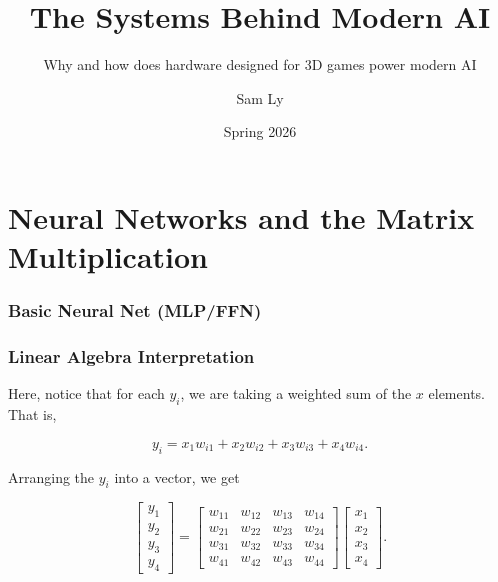 \documentclass{beamer}
\title{The Systems Behind Modern AI}
\subtitle{Why and how does hardware designed for 3D games power modern AI}
\author{Sam Ly}
\institute{Cal Poly Pomona}
\date{Spring 2026}
\begin{document}
\frame{\titlepage}

\section{Neural Networks and the Matrix Multiplication}
\begin{frame}
  \frametitle{Basic Neural Net (MLP/FFN)}
  \centering
\end{frame}

\begin{frame}
  \frametitle{Linear Algebra Interpretation}
  Here, notice that for each \(y_i\), we are taking a weighted sum of the
  \(x\) elements. That is,

  \[y_i = x_1 w_{i1} + x_2 w_{i2} + x_3 w_{i3} + x_4w_{i4}.\]

  Arranging the \(y_i\) into a vector, we get

  \[
    \begin{bmatrix}
      y_1 \\ y_2 \\ y_3 \\ y_4
    \end{bmatrix}
    =
    \begin{bmatrix}
      w_{11} & w_{12} & w_{13} & w_{14} \\
      w_{21} & w_{22} & w_{23} & w_{24} \\
      w_{31} & w_{32} & w_{33} & w_{34} \\
      w_{41} & w_{42} & w_{43} & w_{44}
    \end{bmatrix}
    \begin{bmatrix}
      x_1 \\ x_2 \\ x_3 \\ x_4
    \end{bmatrix}.
  \]

\end{frame}
\end{document}
